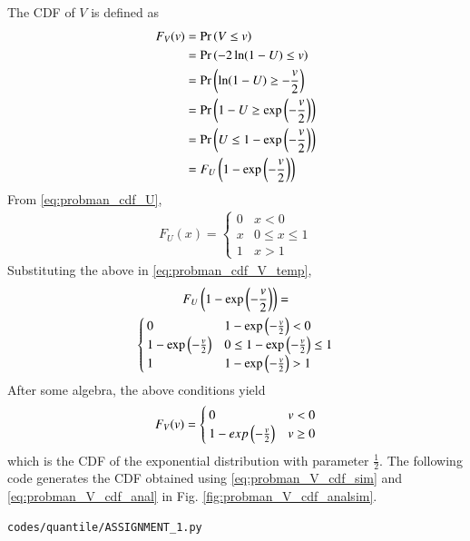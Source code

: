 The CDF of $V$ is defined as 
\begin{align}
    F_V(v) &= \Pr\left(V \le v\right) \\
           &= \Pr\left( -2 \ln(1-U)\le v\right) \\
           &= \Pr\left(\ln(1-U) \ge -\frac{v}{2}\right)\\
           &= \Pr\left(1-U \ge \exp\left(-\frac{v}{2}\right)\right)\\
           &= \Pr\left(U \le 1- \exp\left(-\frac{v}{2}\right)\right)\\
           &= F_U\left(1- \exp\left(-\frac{v}{2}\right)\right)
\label{eq:probman_cdf_V_temp}
\end{align}
From \eqref{eq:probman_cdf_U},
\begin{align}
F_U(x) = 
\begin{cases}
0 &  x < 0 \\
x & 0 \le x \le 1 \\
1 & x > 1
\end{cases}
\end{align}
%
Substituting the above in \eqref{eq:probman_cdf_V_temp},
%
\begin{multline}
F_U\left(1- \exp\left(-\frac{v}{2}\right)\right) =
\\
\begin{cases}
0 &  1- \exp\left(-\frac{v}{2}\right) < 0 \\
1- \exp\left(-\frac{v}{2}\right) & 0 \le 1- \exp\left(-\frac{v}{2}\right) \le 1 \\
1 & 1- \exp\left(-\frac{v}{2}\right) > 1
\end{cases}
\end{multline}
%
After some algebra, the above conditions yield
\begin{align}
F_V(v) = 
\begin{cases}
0 & v < 0 \\
1- exp\left(-\frac{v}{2}\right) & v \ge 0
\end{cases}
\label{eq:probman_V_cdf_anal}
\end{align}
%
which is the CDF of the exponential distribution with parameter $\frac{1}{2}$.  The following
code generates the CDF obtained using \eqref{eq:probman_V_cdf_sim} and \eqref{eq:probman_V_cdf_anal} in Fig. \ref{fig:probman_V_cdf_analsim}.
\begin{lstlisting}
codes/quantile/ASSIGNMENT_1.py
\end{lstlisting}
